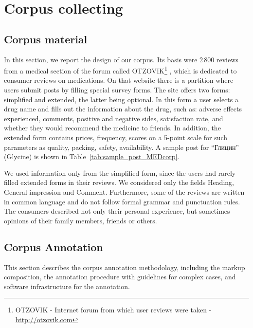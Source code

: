 \documentclass[a4paper,fleqn,longmktitle]{cas-dc}
\begin{document}
\section{Corpus collecting} \label{sec:corpus_collecting}
\subsection{Corpus material} \label{subsec:corpus_material}
 
% 

In this section, we report  the design of our corpus. Its basis were 2\,800 reviews from a medical section of the forum called OTZOVIK\footnote{OTZOVIK - Internet forum from which user reviews were taken - 
\url{http://otzovik.com}}
, which is dedicated to consumer reviews on medications. On that website there is a partition where users submit posts by filling special survey forms. The site offers two forms: simplified and extended, the latter being optional. In this form a user selects a drug name and fills out the information about the drug, such as: adverse effects experienced, comments, positive and negative sides, satisfaction rate, and whether they would recommend the medicine to friends. In addition, the extended form contains prices, frequency, scores on a 5-point scale for such parameters as quality, packing, safety, availability. A sample post for ``Глицин'' (Glycine) is shown in Table~\ref{tab:sample_post_MEDcorp}.

We used information only from the simplified form, since the users had rarely filled extended forms in their reviews. We considered only the fields Heading, General impression and Comment. Furthermore, some of the reviews are written in common language and do not follow formal grammar and punctuation rules. The consumers described not only their personal experience, but sometimes opinions of their family members, friends or others. 


\subsection{Corpus Annotation} \label{subsec:corpus_annotation}
This section describes the corpus annotation methodology, including the markup composition, the annotation procedure with guidelines for complex cases, and software infrastructure for the annotation.
\end{document}
